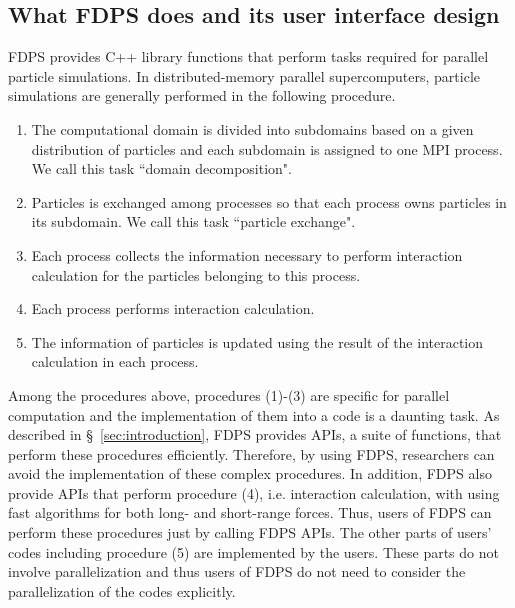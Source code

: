 \documentclass[twocolumn,useamsfonts]{pasj01}
\begin{document}
\subsection{What FDPS does and its user interface design}
\label{subsec:what_fdps_is}
FDPS provides C++ library functions that perform tasks required for parallel particle simulations. In distributed-memory parallel supercomputers, particle simulations are generally performed in the following procedure.
\begin{enumerate}[label=(\arabic*)]
\item The computational domain is divided into subdomains based on a given distribution of particles and each subdomain is assigned to one MPI process. We call this task ``domain decomposition". 
\item Particles is exchanged among processes so that each process owns particles in its subdomain. We call this task ``particle exchange".
\item Each process collects the information necessary to perform interaction calculation for the particles belonging to this process.
\item Each process performs interaction calculation.
\item The information of particles is updated using the result of the interaction calculation in each process.
\end{enumerate}
Among the procedures above, procedures (1)-(3) are specific for parallel computation and the implementation of them into a code is a daunting task. As described in \S~\ref{sec:introduction}, FDPS provides APIs, a suite of functions, that perform these procedures efficiently. Therefore, by using FDPS, researchers can avoid the implementation of these complex procedures. In addition, FDPS also provide APIs that perform procedure (4), i.e. interaction calculation, with using fast algorithms for both long- and short-range forces. Thus, users of FDPS can perform these procedures just by calling FDPS APIs. The other parts of users' codes including procedure (5) are implemented by the users. These parts do not involve parallelization and thus users of FDPS do not need to consider the parallelization of the codes explicitly.
\end{document}
